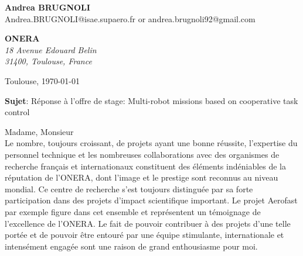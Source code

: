 \documentclass[11pt]{letter}
\begin{document}
 \sffamily
 \begin{flushleft}
 {\bfseries Andrea \textsc{BRUGNOLI}}\\[.35ex]
 Andrea.BRUGNOLI@isae.supaero.fr or andrea.brugnoli92@gmail.com
 \end{flushleft}
 \begin{flushright}
 {\bfseries ONERA}\\[.35ex]
 \small\itshape
 18 Avenue Edouard Belin\\
 31400, Toulouse, France
 \end{flushright}
 \begin{flushright}
 Toulouse, \today 
 \end{flushright}
 \textbf{Sujet}: Réponse à l'offre de stage:  Multi-robot missions based on cooperative task control


Madame, Monsieur \\
Le nombre, toujours croissant, de projets ayant une bonne réussite, l'expertise du personnel technique et les nombreuses collaborations avec des organismes de recherche français et internationaux constituent  des éléments indéniables de la réputation de l'ONERA, dont l'image et le prestige sont reconnus au niveau mondial. Ce centre de recherche s'est toujours distinguée par sa forte participation dans des projets d'impact scientifique important. Le projet Aerofast par exemple figure dans cet ensemble et représentent un témoignage de l'excellence de l'ONERA. Le fait de pouvoir contribuer à des projets d'une telle portée et de pouvoir être entouré par une équipe stimulante, internationale et intensément engagée sont une raison de grand enthousiasme pour moi. 
\end{document}
